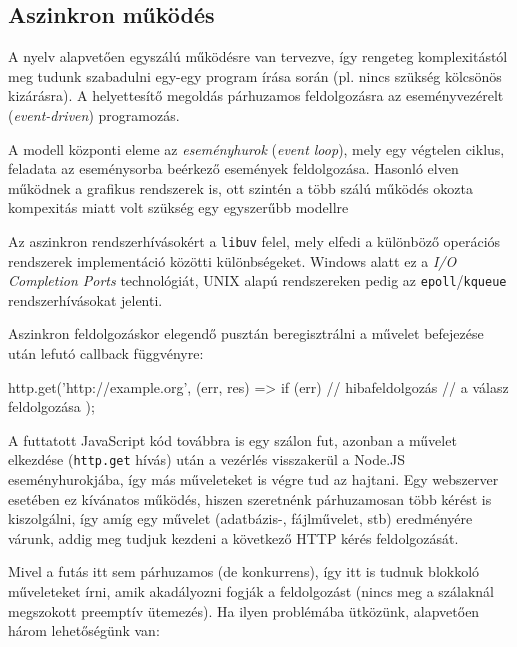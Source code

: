 \subsection{Aszinkron működés}

A nyelv alapvetően egyszálú működésre van tervezve, így rengeteg komplexitástól
meg tudunk szabadulni egy-egy program írása során (pl. nincs szükség kölcsönös
kizárásra).  A helyettesítő megoldás párhuzamos feldolgozásra az eseményvezérelt
(\emph{event-driven}) programozás.

A modell központi eleme az \emph{eseményhurok} (\emph{event loop}), mely egy
végtelen ciklus, feladata az eseménysorba beérkező események feldolgozása.
Hasonló elven működnek a grafikus rendszerek is, ott szintén a több szálú
működés okozta kompexitás miatt volt szükség egy egyszerűbb modellre

Az aszinkron rendszerhívásokért a \texttt{libuv} felel, mely elfedi a különböző
operációs rendszerek implementáció közötti különbségeket.  Windows alatt ez a
\emph{I/O Completion Ports} technológiát, UNIX alapú rendszereken pedig az
\texttt{epoll}/\texttt{kqueue} rendszerhívásokat jelenti.


Aszinkron feldolgozáskor elegendő pusztán beregisztrálni a művelet befejezése
után lefutó callback függvényre:

\begin{js}
http.get('http://example.org', (err, res) => {
  if (err) {
    // hibafeldolgozás
  }
  // a válasz feldolgozása
});
\end{js}

A futtatott JavaScript kód továbbra is egy szálon fut, azonban a művelet
elkezdése (\texttt{http.get} hívás) után a vezérlés visszakerül a Node.JS
eseményhurokjába, így más műveleteket is végre tud az hajtani.  Egy webszerver
esetében ez kívánatos működés, hiszen szeretnénk párhuzamosan több kérést is
kiszolgálni, így amíg egy művelet (adatbázis-, fájlművelet, stb) eredményére
várunk, addig meg tudjuk kezdeni a következő HTTP kérés feldolgozását.

Mivel a futás itt sem párhuzamos (de konkurrens), így itt is tudnuk blokkoló
műveleteket írni, amik akadályozni fogják a feldolgozást (nincs meg a szálaknál
megszokott preemptív ütemezés).  Ha ilyen problémába ütközünk, alapvetően három
lehetőségünk van:

